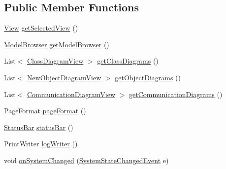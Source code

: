 \subsection*{Public Member Functions}
\begin{DoxyCompactItemize}
\item 
\hyperlink{interfaceorg_1_1tzi_1_1use_1_1gui_1_1views_1_1_view}{View} \hyperlink{classorg_1_1tzi_1_1use_1_1gui_1_1main_1_1_main_window_a39ececf1e4871dacf650bce6b6fd1837}{get\-Selected\-View} ()
\item 
\hyperlink{classorg_1_1tzi_1_1use_1_1gui_1_1main_1_1_model_browser}{Model\-Browser} \hyperlink{classorg_1_1tzi_1_1use_1_1gui_1_1main_1_1_main_window_a9ea5f7b1e97fde85e20a6f502a39d2ed}{get\-Model\-Browser} ()
\item 
List$<$ \hyperlink{classorg_1_1tzi_1_1use_1_1gui_1_1views_1_1diagrams_1_1classdiagram_1_1_class_diagram_view}{Class\-Diagram\-View} $>$ \hyperlink{classorg_1_1tzi_1_1use_1_1gui_1_1main_1_1_main_window_af586a716d4e83fa168c95183184ea8a2}{get\-Class\-Diagrams} ()
\item 
List$<$ \hyperlink{classorg_1_1tzi_1_1use_1_1gui_1_1views_1_1diagrams_1_1objectdiagram_1_1_new_object_diagram_view}{New\-Object\-Diagram\-View} $>$ \hyperlink{classorg_1_1tzi_1_1use_1_1gui_1_1main_1_1_main_window_aeec1c4cd7d04c43aa1a1a3e7a81dee18}{get\-Object\-Diagrams} ()
\item 
List$<$ \hyperlink{classorg_1_1tzi_1_1use_1_1gui_1_1views_1_1diagrams_1_1behavior_1_1communicationdiagram_1_1_communication_diagram_view}{Communication\-Diagram\-View} $>$ \hyperlink{classorg_1_1tzi_1_1use_1_1gui_1_1main_1_1_main_window_a3978275970f12e619661e7ee59e8e0c5}{get\-Communication\-Diagrams} ()
\item 
Page\-Format \hyperlink{classorg_1_1tzi_1_1use_1_1gui_1_1main_1_1_main_window_a18f46bc64bf324a308a664488866b7e7}{page\-Format} ()
\item 
\hyperlink{classorg_1_1tzi_1_1use_1_1gui_1_1util_1_1_status_bar}{Status\-Bar} \hyperlink{classorg_1_1tzi_1_1use_1_1gui_1_1main_1_1_main_window_a01ec2c023df8967ba2cdcff4dec80a57}{status\-Bar} ()
\item 
Print\-Writer \hyperlink{classorg_1_1tzi_1_1use_1_1gui_1_1main_1_1_main_window_a5f006319d363f3a1d3430c9ced6dff3b}{log\-Writer} ()
\item 
void \hyperlink{classorg_1_1tzi_1_1use_1_1gui_1_1main_1_1_main_window_a9fefaa2d3587d5830f33bc235728e1a5}{on\-System\-Changed} (\hyperlink{interfaceorg_1_1tzi_1_1use_1_1uml_1_1sys_1_1events_1_1tags_1_1_system_state_changed_event}{System\-State\-Changed\-Event} e)

\end{DoxyCompactItemize}
